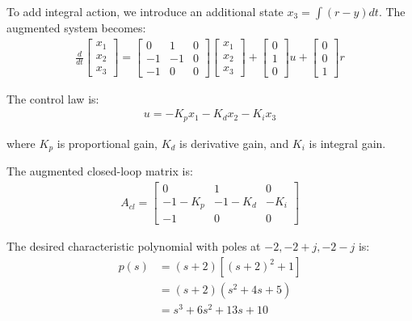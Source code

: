 \documentclass[11pt,a4paper]{article}
\begin{document}
To add integral action, we introduce an additional state $x_3 = \int (r - y) dt$. The augmented system becomes:
\begin{align}
\frac{d}{dt}\begin{bmatrix} x_1 \\ x_2 \\ x_3 \end{bmatrix} = \begin{bmatrix} 0 & 1 & 0 \\ -1 & -1 & 0 \\ -1 & 0 & 0 \end{bmatrix}\begin{bmatrix} x_1 \\ x_2 \\ x_3 \end{bmatrix} + \begin{bmatrix} 0 \\ 1 \\ 0 \end{bmatrix}u + \begin{bmatrix} 0 \\ 0 \\ 1 \end{bmatrix}r
\end{align}

The control law is:
\begin{align}
u = -K_p x_1 - K_d x_2 - K_i x_3
\end{align}

where $K_p$ is proportional gain, $K_d$ is derivative gain, and $K_i$ is integral gain.

The augmented closed-loop matrix is:
\begin{align}
A_{cl} = \begin{bmatrix} 0 & 1 & 0 \\ -1-K_p & -1-K_d & -K_i \\ -1 & 0 & 0 \end{bmatrix}
\end{align}

The desired characteristic polynomial with poles at $-2, -2+j, -2-j$ is:
\begin{align}
p(s) &= (s+2)\left[(s+2)^2 + 1\right] \\
&= (s+2)(s^2 + 4s + 5) \\
&= s^3 + 6s^2 + 13s + 10
\end{align}
\end{document}
